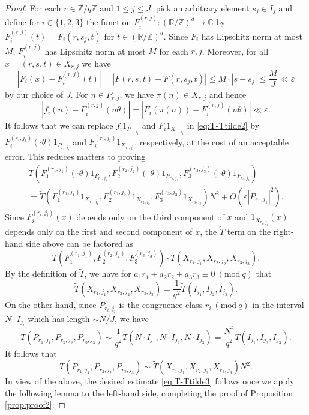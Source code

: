 \documentclass[12pt, notitlepage]{amsart}
\numberwithin{equation}{section}
\def\R{\mathbb R}
\def\Z{\mathbb Z}
\def\C{\mathbb C}
\def\wt{\widetilde}
\newcommand{\eps}{\varepsilon}
\newcommand{\Mod}[1]{\ (\mathrm{mod}\ #1)}
\theoremstyle{remark}
\theoremstyle{definition}
\theoremstyle{remark}
\numberwithin{equation}{section}
\begin{document}
\begin{proof}
For each $r\in\Z/q\Z$ and $1 \leq j \leq J$, pick an arbitrary element $s_j \in I_j$ and define for $i \in \{1,2,3\}$ the function $F_i^{(r,j)}: (\R/\Z)^d\rightarrow \C$ by $F_i^{(r,j)}(t) = F_i(r, s_j, t)$ for $t \in (\R/\Z)^d$. Since $F_i$ has Lipschitz norm at most $M$, $F_i^{(r,j)}$ has Lipschitz norm at most $M$ for each $r,j$. Moreover, for all $x = (r,s,t)\in X_{r,j}$ we have
$$
|F_i(x) - F_i^{(r,j)}(t)| = |F(r,s,t) - F(r,s_j,t)| \leq M\cdot |s-s_j| \leq \frac{M}{J} \ll \eps
$$
by our choice of $J$. For $n \in P_{r,j}$, we have $\pi(n) \in X_{r,j}$ and hence
$$
|f_i(n) - F_i^{(r,j)}(n\theta)|  = |F_i(\pi(n)) - F_i^{(r,j)}(n\theta)| \ll \eps.
$$
It follows that we can replace $f_i1_{P_{r_i,j_i}}$ and $F_i1_{X_{r_i,j_i}}$ in \eqref{eq:T-Ttilde2} by $F_i^{(r_i,j_i)}(\cdot \theta)1_{P_{r_i,j_i}}$ and $F_i^{(r_i,j_i)}1_{X_{r_i,j_i}}$, respectively, at the cost of an acceptable error. This reduces matters to proving
\begin{multline}\label{eq:T-Ttilde3}
T(F_1^{(r_1,j_1)}(\cdot\theta)1_{P_{r_1,j_1}}, F_2^{(r_2,j_2)}(\cdot\theta)1_{P_{r_2,j_2}}, F_3^{(r_3,j_3)}(\cdot\theta)1_{P_{r_3,j_3}}) \\
 =\wt{T}(F_1^{(r_1,j_1)}1_{X_{r_1,j_1}}, F_2^{(r_2,j_2)}1_{X_{r_2,j_2}}, F_3^{(r_3,j_3)}1_{X_{r_3,j_3}}) N^2 + O(\eps |P_{r_1,j_1}|^2).
\end{multline}
Since $F_i^{(r_i,j_i)}(x)$ depends only on the third component of $x$ and $1_{X_{r_i,j_i}}(x)$ depends only on the first and second component of $x$, the $\wt{T}$ term on the right-hand side above can be factored as
$$
\wt{T}(F_1^{(r_1,j_1)}, F_2^{(r_2,j_2)}, F_3^{(r_3,j_3)}) \cdot \wt{T}(X_{r_1,j_1}, X_{r_2,j_2}, X_{r_3,j_3}).
$$
By the definition of $\wt{T}$, we have for $a_1r_1 + a_2r_2 +a_3r_3 \equiv 0\Mod{q}$ that
$$
\wt{T}(X_{r_1,j_1}, X_{r_2,j_2}, X_{r_3,j_3}) = \frac{1}{q^2} \wt{T}(I_{j_1}, I_{j_2}, I_{j_3}).
$$
On the other hand, since $P_{r_i,j_i}$ is the congruence class $r_i\Mod{q}$ in the interval $N\cdot I_{j_i}$ which has length $\sim N/J$, we have
$$
T(P_{r_1,j_1}, P_{r_2,j_2}, P_{r_3,j_3}) \sim \frac{1}{q^2} \wt{T}(N\cdot I_{j_1}, N \cdot I_{j_2}, N\cdot I_{j_3})= \frac{N^2}{q^2} \wt{T}(I_{j_1}, I_{j_2}, I_{j_3}) .
$$
It follows that
$$
T(P_{r_1,j_1},P_{r_2,j_2},P_{r_3,j_3}) \sim \wt{T}(X_{r_1,j_1}, X_{r_2,j_2}, X_{r_3,j_3})N^2.
$$
In view of the above, the desired estimate \eqref{eq:T-Ttilde3} follows once we apply the following lemma to the left-hand side, completing the proof of Proposition \ref{prop:proof2}.
\end{proof}
\end{document}
